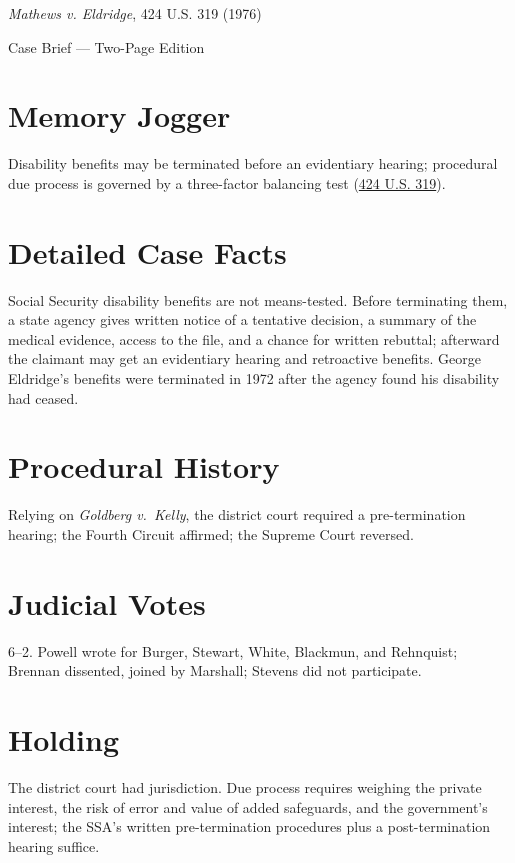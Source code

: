 \documentclass[12pt]{article}
\begin{document}
\begin{center}
{\LARGE \textit{Mathews v. Eldridge}, 424 U.S. 319 (1976)\par}
\vspace{0.5em}
{\large Case Brief --- Two-Page Edition\par}
\end{center}

\section{Memory Jogger}
Disability benefits may be terminated before an evidentiary hearing; procedural due process is governed by a three-factor balancing test (\href{https://supreme.justia.com/cases/federal/us/424/319/}{424 U.S. 319}).

\section{Detailed Case Facts}
Social Security disability benefits are not means-tested. Before terminating them, a state agency gives written notice of a tentative decision, a summary of the medical evidence, access to the file, and a chance for written rebuttal; afterward the claimant may get an evidentiary hearing and retroactive benefits. George Eldridge's benefits were terminated in 1972 after the agency found his disability had ceased.

\section{Procedural History}
Relying on \textit{Goldberg v.\ Kelly}, the district court required a pre-termination hearing; the Fourth Circuit affirmed; the Supreme Court reversed.

\section{Judicial Votes}
6--2. Powell wrote for Burger, Stewart, White, Blackmun, and Rehnquist; Brennan dissented, joined by Marshall; Stevens did not participate.

\section{Holding}
The district court had jurisdiction. Due process requires weighing the private interest, the risk of error and value of added safeguards, and the government's interest; the SSA's written pre-termination procedures plus a post-termination hearing suffice.
\end{document}
